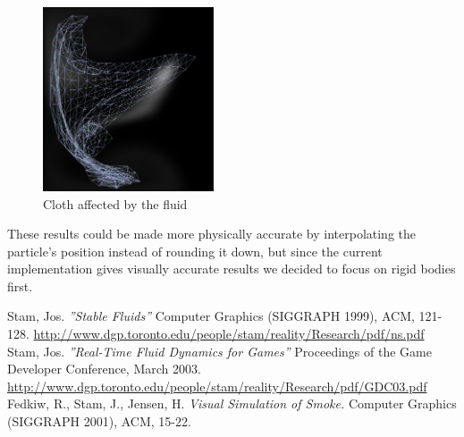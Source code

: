 \documentclass[a4paper,twoside,11pt,twocolumn]{article}
\begin{document}
\begin{figure}[h]
	\centering
	\includegraphics[width=0.45\textwidth]{cloth}
	\caption{Cloth affected by the fluid}
	\label{fig:cloth}
\end{figure}

These results could be made more physically accurate by interpolating the particle's position instead of rounding it down, but since the current implementation gives visually accurate results we decided to focus on rigid bodies first.

\begin{thebibliography}{9}
		Stam, Jos. \emph{''Stable Fluids''} Computer Graphics (SIGGRAPH 1999), ACM, 121-128. \url{http://www.dgp.toronto.edu/people/stam/reality/Research/pdf/ns.pdf}
		Stam, Jos. \emph{''Real-Time Fluid Dynamics for Games''} Proceedings of the Game Developer Conference, March 2003. \url{http://www.dgp.toronto.edu/people/stam/reality/Research/pdf/GDC03.pdf}
		Fedkiw, R., Stam, J., Jensen, H. \emph{Visual Simulation of Smoke.} Computer Graphics (SIGGRAPH 2001), ACM, 15-22.
	
\end{thebibliography}
\end{document}
